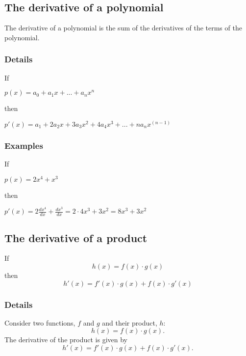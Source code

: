 \documentclass[12pt,a4paper]{article}
\theoremstyle{regla}
\theoremstyle{remark}
\theoremstyle{definition}
\theoremstyle{nonumberbreak}
\begin{document}
\subsection{The derivative of a polynomial}
\begin{fbox}
\begin{minipage}{0.97\textwidth}
The derivative of a polynomial is the sum of the derivatives of the terms of the polynomial.
\end{minipage}
\end{fbox}
\subsubsection{Details}
If 

$p(x)=a_0+a_1x+...+a_n x^n$

then

$p'(x)=a_1+2a_2x+3a_3x^2+4a_4x^3+...+na_n x^{(n-1)}$
\subsubsection{Examples}
\begin{xmpl}
If

$p(x)=2x^4+x^3$

then

$p'(x)=2\frac{dx^4}{dx}+\frac{dx^3}{dx}=2 \cdot 4x^3 +3x^2 = 8x^3 +3x^2$
\end{xmpl}

\subsection{The derivative of a product}
\begin{fbox}
\begin{minipage}{0.97\textwidth}
If
$$
h(x)=f(x)\cdot g(x)
$$
then
$$
h'(x)=f'(x)\cdot g(x)+f(x)\cdot g'(x)
$$

\end{minipage}
\end{fbox}
\subsubsection{Details}
Consider two functions, $f$ and $g$ and their product, $h$:
$$
h(x)=f(x)\cdot g(x).
$$
The derivative of the product is given by
$$
h'(x)=f'(x)\cdot g(x)+f(x)\cdot g'(x).
$$
\end{document}
